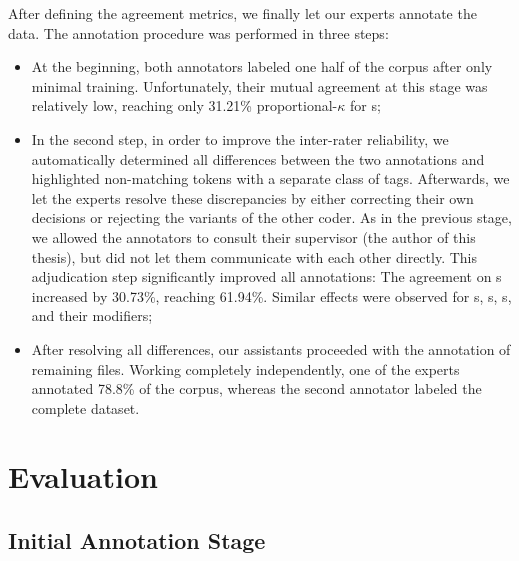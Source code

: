 After defining the agreement metrics, we finally let our experts
annotate the data.  The annotation procedure was performed in three
steps:
\begin{itemize}
  \item At the beginning, both annotators labeled one half of the
    corpus after only minimal training.  Unfortunately, their mutual
    agreement at this stage was relatively low, reaching only 31.21\%
    proportional-$\kappa$ for s;
  \item In the second step, in order to improve the inter-rater
    reliability, we automatically determined all differences between
    the two annotations and highlighted non-matching tokens with a
    separate class of tags. Afterwards, we let the experts resolve
    these discrepancies by either correcting their own decisions or
    rejecting the variants of the other coder.  As in the previous
    stage, we allowed the annotators to consult their supervisor (the
    author of this thesis), but did not let them communicate with each
    other directly.  This adjudication step significantly improved all
    annotations: The agreement on s increased by
    30.73\%, reaching 61.94\%.  Similar effects were observed for
    s, s, s,
    and their modifiers;
  \item After resolving all differences, our assistants proceeded with
    the annotation of remaining files.  Working completely
    independently, one of the experts annotated 78.8\% of the corpus,
    whereas the second annotator labeled the complete dataset.
\end{itemize}

\section{Evaluation}\label{sec:eval}

\subsection{Initial Annotation Stage}\label{subsec:eval-initial-stage}

